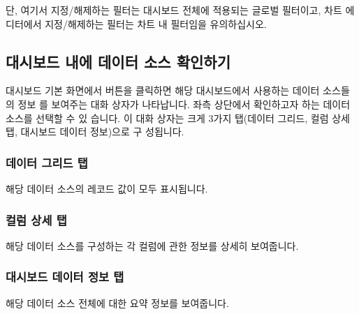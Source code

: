 \documentclass[letterpaper,10pt,english]{sphinxmanual}
\begin{document}
단, 여기서 지정/해제하는 필터는 대시보드 전체에 적용되는 글로벌 필터이고, 차트 에디터에서 지정/해제하는 필터는 차트 내 필터임을 유의하십시오.


\subsection{대시보드 내에 데이터 소스 확인하기}
\label{\detokenize{discovery/part04/display_a_data_source:id1}}\label{\detokenize{discovery/part04/display_a_data_source::doc}}
대시보드 기본 화면에서  버튼을 클릭하면 해당 대시보드에서 사용하는 데이터 소스들의 정보 를 보여주는 대화 상자가 나타납니다. 좌측 상단에서 확인하고자 하는 데이터 소스를 선택할 수 있 습니다. 이 대화 상자는 크게 3가지 탭(데이터 그리드, 컬럼 상세 탭, 대시보드 데이터 정보)으로 구 성됩니다.


\subsubsection{데이터 그리드 탭}
\label{\detokenize{discovery/part04/display_a_data_source:id2}}
해당 데이터 소스의 레코드 값이 모두 표시됩니다.
\begin{quote}

\begin{figure}[H]
\centering

\noindent{}
\end{figure}
\end{quote}


\subsubsection{컬럼 상세 탭}
\label{\detokenize{discovery/part04/display_a_data_source:id3}}
해당 데이터 소스를 구성하는 각 컬럼에 관한 정보를 상세히 보여줍니다.
\begin{quote}

\begin{figure}[H]
\centering

\noindent{}
\end{figure}
\end{quote}


\subsubsection{대시보드 데이터 정보 탭}
\label{\detokenize{discovery/part04/display_a_data_source:id4}}
해당 데이터 소스 전체에 대한 요약 정보를 보여줍니다.
\begin{quote}

\begin{figure}[H]
\centering

\noindent{}
\end{figure}
\end{quote}
\end{document}
